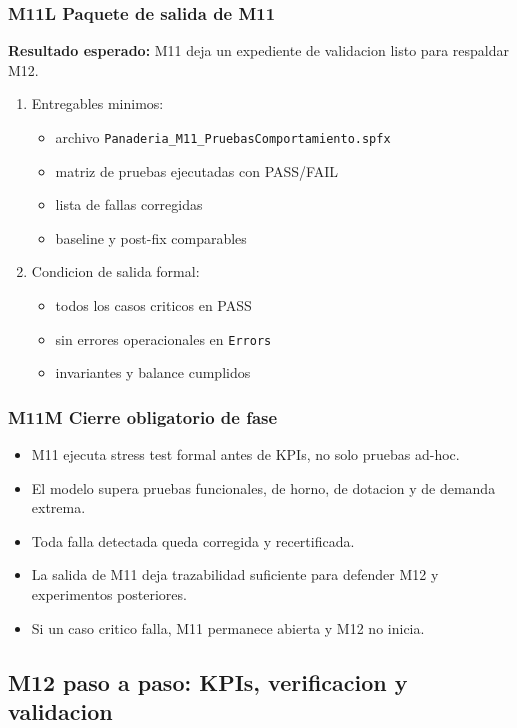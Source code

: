 \documentclass[11pt]{article}
\newcommand{\simio}[1]{\texttt{#1}}
\begin{document}
\subsubsection{M11L Paquete de salida de M11}
\textbf{Resultado esperado:} M11 deja un expediente de validacion listo para respaldar M12.

\begin{enumerate}
  \item Entregables minimos:
  \begin{itemize}
    \item archivo \simio{Panaderia\_M11\_PruebasComportamiento.spfx}
    \item matriz de pruebas ejecutadas con PASS/FAIL
    \item lista de fallas corregidas
    \item baseline y post-fix comparables
  \end{itemize}
  \item Condicion de salida formal:
  \begin{itemize}
    \item todos los casos criticos en PASS
    \item sin errores operacionales en \simio{Errors}
    \item invariantes y balance cumplidos
  \end{itemize}
\end{enumerate}

\subsubsection{M11M Cierre obligatorio de fase}
\begin{itemize}
  \item M11 ejecuta stress test formal antes de KPIs, no solo pruebas ad-hoc.
  \item El modelo supera pruebas funcionales, de horno, de dotacion y de demanda extrema.
  \item Toda falla detectada queda corregida y recertificada.
  \item La salida de M11 deja trazabilidad suficiente para defender M12 y experimentos posteriores.
  \item Si un caso critico falla, M11 permanece abierta y M12 no inicia.
\end{itemize}

\subsection{M12 paso a paso: KPIs, verificacion y validacion}
\end{document}
